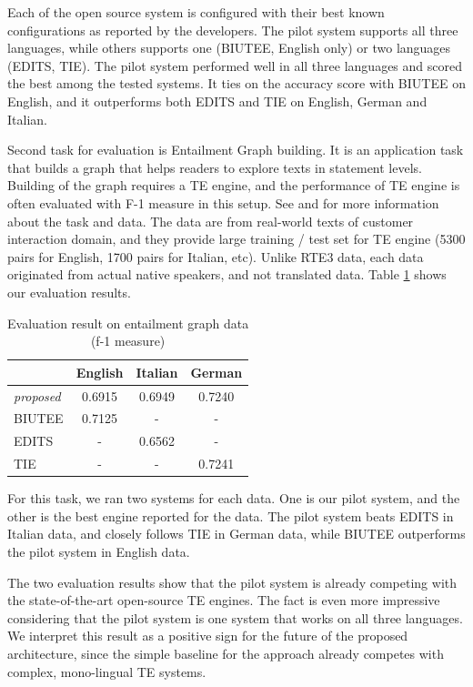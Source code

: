 \documentclass[11pt,letterpaper]{article}
\begin{document}
Each of the open source system is configured with their best known
configurations as reported by the developers. The pilot system
supports all three languages, while others supports one (BIUTEE,
English only) or two languages (EDITS, TIE). The pilot system
performed well in all three languages and scored the best among the
tested systems. It ties on the accuracy score with BIUTEE on English,
and it outperforms both EDITS and TIE on English, German and Italian.  

Second task for evaluation is Entailment Graph building. It is an
application task that builds a graph that helps readers to explore
texts in statement levels. Building of the graph requires a TE engine,
and the performance of TE engine is often evaluated with F-1 measure
in this setup. See \cite{} and \cite{} for more information about the
task and data.
The data are from real-world texts of customer interaction domain, and 
they provide large training / test set for TE engine (5300 pairs for
English, 1700 pairs for Italian, etc). Unlike RTE3 data, each data
originated from actual native speakers, and not translated data. Table 
\ref{table:egraph} shows our evaluation results.        

\begin{table}[t!]
\centering
\small
\begin{tabular}{l|ccc}
              &   English    &   Italian   &  German  \\
\hline
{\em proposed}&   0.6915     &   0.6949    &   0.7240  \\
BIUTEE        &   0.7125     &     -       &     -     \\
EDITS         &      -       &   0.6562    &     -     \\
TIE           &      -       &     -       &   0.7241  \\ 
\end{tabular}
\caption{Evaluation result on entailment graph data (f-1 measure)}
\label{table:egraph}
\end{table}

For this task, we ran two systems for each data. One is our pilot
system, and the other is the best engine reported for the data. The
pilot system beats EDITS in Italian data, and closely follows TIE in
German data, while BIUTEE outperforms the pilot system in English
data.   

The two evaluation results show that the pilot system is already
competing with the state-of-the-art open-source TE engines. The fact 
is even more impressive considering that the pilot system is one
system that works on all three languages. We interpret this result as a
positive sign for the future of the proposed architecture, since the
simple baseline for the approach already competes with complex,
mono-lingual TE systems. 
\end{document}
